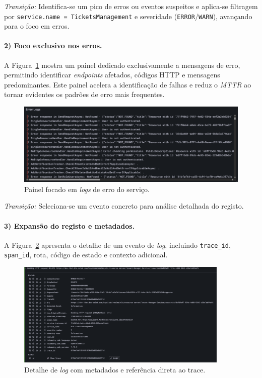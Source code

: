 \textit{Transição:} Identifica-se um pico de erros ou eventos suspeitos e aplica-se filtragem 
por \texttt{service.name = TicketsManagement} e severidade (\texttt{ERROR}/\texttt{WARN}), avançando para o foco em erros.

\paragraph{2) Foco exclusivo nos erros.}

A Figura~\ref{fig:dash-2} mostra um painel dedicado exclusivamente a mensagens de erro, 
permitindo identificar \textit{endpoints} afetados, códigos HTTP e mensagens predominantes. 
Este painel acelera a identificação de falhas e reduz o \textit{MTTR} ao tornar evidentes os padrões de erro mais frequentes.

\begin{figure}[H]
    \centering
    \includegraphics[width=\textwidth]{images/Grafana/error_logs_dashboard.png}
    \caption{Painel focado em \textit{logs} de erro do serviço.}
    \label{fig:dash-2}
\end{figure}

\textit{Transição:} Seleciona-se um evento concreto para análise detalhada do registo.

\paragraph{3) Expansão do registo e metadados.}

A Figura~\ref{fig:dash-3} apresenta o detalhe de um evento de \textit{log}, incluindo
\texttt{trace\_id}, \texttt{span\_id}, rota, código de estado e contexto adicional.

\begin{figure}[H]
    \centering
    \includegraphics[width=0.9\textwidth]{images/Grafana/log_expanded.png}
    \caption{Detalhe de \textit{log} com metadados e referência direta ao trace.}
    \label{fig:dash-3}
\end{figure}

